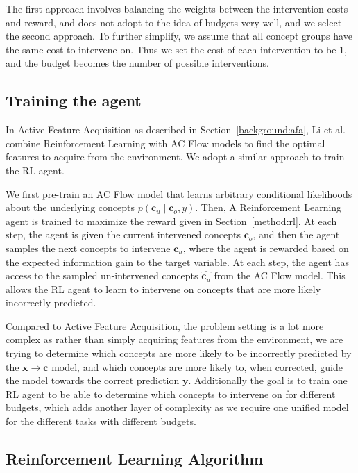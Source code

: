 The first approach
involves balancing the weights between the intervention costs and reward, and does not 
adopt to the idea of budgets very well, and we select the second approach.
To further simplify, we assume that all concept groups have the same cost
to intervene on. Thus we set the cost of each intervention to be 1, and the budget
becomes the number of possible interventions.

\subsection{Training the agent}

In Active Feature Acquisition as described in Section~\ref{background:afa},
Li et al.~\cite{afa} combine Reinforcement Learning with 
AC Flow models to find the optimal features to acquire 
from the environment. We
adopt a similar approach to train the RL agent.

We first pre-train an AC Flow model that learns 
arbitrary conditional likelihoods about the underlying
concepts $p(\mathbf{c}_u \mid \mathbf{c}_o, y)$. 
Then, A Reinforcement Learning agent is trained to maximize 
the reward given in Section~\ref{method:rl}. 
At each
step, the agent is given the current intervened concepts $\mathbf{c}_o$, 
and then the agent samples the next 
concepts to intervene $\mathbf{c}_u$, 
where the agent is rewarded based on the expected information gain
to the target variable.
At each step, the agent has access to the sampled un-intervened concepts $\hat{\mathbf{c}_u}$ 
from the AC Flow model. This allows the RL agent to learn to intervene on concepts that are 
more likely incorrectly predicted.

Compared to Active Feature Acquisition, the problem setting is a lot more complex as
rather than simply acquiring features from the environment, we are trying to determine
which concepts are more likely to be incorrectly predicted by the $\mathbf{x} \to \mathbf{c}$ model, 
and
which concepts are more likely to, when corrected, guide the model towards the correct prediction
 $\mathbf{y}$.
Additionally the goal is to train one RL agent to be able to determine which concepts
to intervene on for different budgets, which adds another layer of complexity as we require
one unified model for the different tasks with different budgets.

\subsection{Reinforcement Learning Algorithm}

